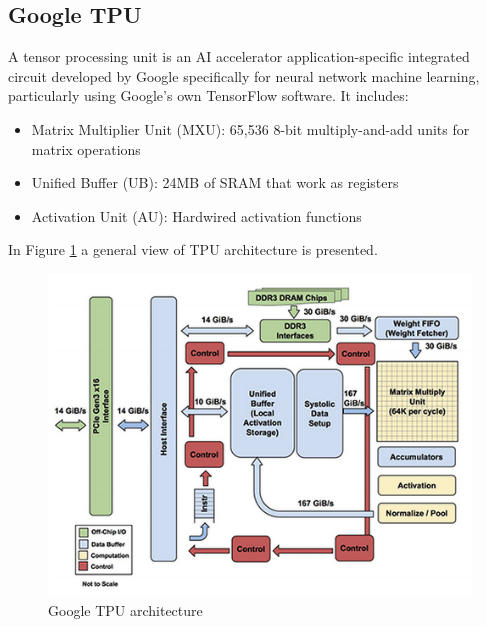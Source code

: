 \subsection{Google TPU}
A tensor processing unit is an AI accelerator application-specific integrated circuit  developed by Google specifically for neural network machine learning, particularly using Google's own TensorFlow software. 	
	It includes: 
	\begin{itemize}
	\item     Matrix Multiplier Unit (MXU): 65,536 8-bit multiply-and-add units for matrix operations
	\item     Unified Buffer (UB): 24MB of SRAM that work as registers
\item Activation Unit (AU): Hardwired activation functions
	\end{itemize}
	
	In Figure \ref{fig:tpuarch} a general view of TPU architecture is presented.
	\begin{figure}[H] 
\centering
\captionsetup{justification=centering}
  \includegraphics[scale=0.8]{./figure/tpu_arch.PNG}
\caption{Google TPU architecture}
  \label{fig:tpuarch}
\end{figure} 


